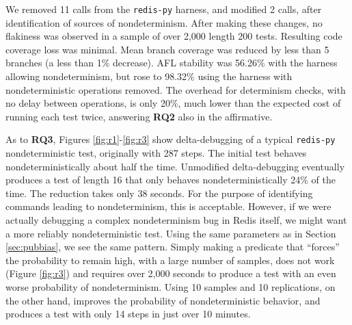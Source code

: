 {

We removed 11 calls from the {\tt redis-py} harness, and  modified 2
calls, after
identification of sources of nondeterminism.  After making these changes, no flakiness was observed in a sample of over 2,000 length
200 tests.   Resulting code coverage loss was minimal.
Mean branch coverage  was reduced
by less than 5 branches (a less than 1\% decrease).  AFL stability was 56.26\% with the harness allowing 
nondeterminism, but rose to 98.32\% using the harness with 
nondeterministic operations removed.  The overhead for
determinism checks, with no delay between operations, is only
20\%, much lower than the expected cost of running each test twice,
answering {\bf RQ2} also in the affirmative. 

As to {\bf RQ3}, Figures \ref{fig:r1}-\ref{fig:r3} show delta-debugging of a typical
{\tt redis-py} nondeterministic test, originally with 287 steps.  The initial test behaves
nondeterministically about half the time.  Unmodified delta-debugging
eventually produces a test of length 16 that only behaves
nondeterministically 24\% of the time.  The reduction takes only 38
seconds.  For the purpose of identifying commands leading to
nondeterminism, this is acceptable.  However, if we were actually
debugging a complex nondeterminism bug in Redis itself, we might want
a more reliably nondeterministic test.  Using the same parameters as
in Section \ref{sec:pubbias}, we see the same pattern.  Simply making
a predicate that ``forces'' the probability to remain high, with a
large number of samples, does not work (Figure \ref{fig:r3}) and
requires over 2,000 seconds to produce a test with an even worse
probability of nondeterminism.  Using 10 samples and 10 replications,
on the other hand, improves the probability of
nondeterministic behavior, and produces a test with only 14 steps in just
over 10 minutes.

}
